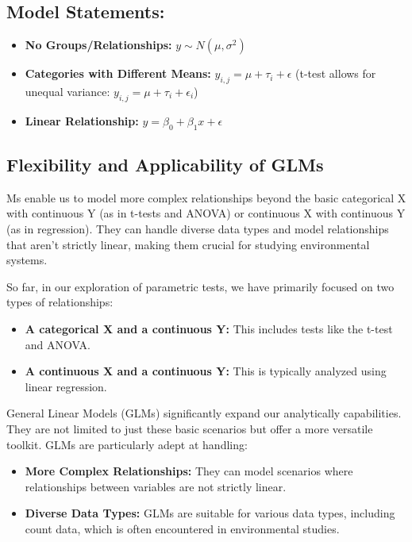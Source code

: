 \documentclass[
  letterpaper,
  DIV=11,
  numbers=noendperiod]{scrreprt}
\providecommand{\tightlist}{%
  \setlength{\itemsep}{0pt}\setlength{\parskip}{0pt}}\usepackage{longtable,booktabs,array}
\begin{document}
\subsection{Model Statements:}\label{model-statements}

\begin{itemize}
\tightlist
\item
  \textbf{No Groups/Relationships:} \(y \sim N(\mu, \sigma^2)\)
\item
  \textbf{Categories with Different Means:}
  \(y_{i,j} = \mu + \tau_i + \epsilon\) (t-test allows for unequal
  variance: \(y_{i,j} = \mu + \tau_i + \epsilon_i\))
\item
  \textbf{Linear Relationship:} \(y = \beta_0 + \beta_1x + \epsilon\)
\end{itemize}

\subsection{Flexibility and Applicability of
GLMs}\label{flexibility-and-applicability-of-glms}

Ms enable us to model more complex relationships beyond the basic
categorical X with continuous Y (as in t-tests and ANOVA) or continuous
X with continuous Y (as in regression). They can handle diverse data
types and model relationships that aren't strictly linear, making them
crucial for studying environmental systems.

So far, in our exploration of parametric tests, we have primarily
focused on two types of relationships:

\begin{itemize}
\tightlist
\item
  \textbf{A categorical X and a continuous Y:} This includes tests like
  the t-test and ANOVA.
\item
  \textbf{A continuous X and a continuous Y:} This is typically analyzed
  using linear regression.
\end{itemize}

General Linear Models (GLMs) significantly expand our analytically
capabilities. They are not limited to just these basic scenarios but
offer a more versatile toolkit. GLMs are particularly adept at handling:

\begin{itemize}
\tightlist
\item
  \textbf{More Complex Relationships:} They can model scenarios where
  relationships between variables are not strictly linear.
\item
  \textbf{Diverse Data Types:} GLMs are suitable for various data types,
  including count data, which is often encountered in environmental
  studies.
\end{itemize}
\end{document}
